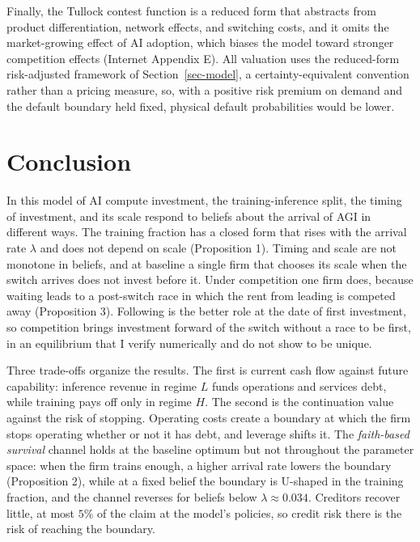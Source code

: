 \documentclass[
  11pt,
  letterpaper,
]{scrartcl}
\begin{document}
Finally, the Tullock contest function is a reduced form that abstracts
from product differentiation, network effects, and switching costs, and
it omits the market-growing effect of AI adoption, which biases the
model toward stronger competition effects (Internet Appendix E). All
valuation uses the reduced-form risk-adjusted framework of
Section~\ref{sec-model}, a certainty-equivalent convention rather than a
pricing measure, so, with a positive risk premium on demand and the
default boundary held fixed, physical default probabilities would be
lower.

\section{Conclusion}\label{sec-conclusion}

In this model of AI compute investment, the training-inference split,
the timing of investment, and its scale respond to beliefs about the
arrival of AGI in different ways. The training fraction has a closed
form that rises with the arrival rate \(\lambda\) and does not depend on
scale (Proposition 1). Timing and scale are not monotone in beliefs, and
at baseline a single firm that chooses its scale when the switch arrives
does not invest before it. Under competition one firm does, because
waiting leads to a post-switch race in which the rent from leading is
competed away (Proposition 3). Following is the better role at the date
of first investment, so competition brings investment forward of the
switch without a race to be first, in an equilibrium that I verify
numerically and do not show to be unique.

Three trade-offs organize the results. The first is current cash flow
against future capability: inference revenue in regime \(L\) funds
operations and services debt, while training pays off only in regime
\(H\). The second is the continuation value against the risk of
stopping. Operating costs create a boundary at which the firm stops
operating whether or not it has debt, and leverage shifts it. The
\emph{faith-based survival} channel holds at the baseline optimum but
not throughout the parameter space: when the firm trains enough, a
higher arrival rate lowers the boundary (Proposition 2), while at a
fixed belief the boundary is U-shaped in the training fraction, and the
channel reverses for beliefs below \(\lambda \approx 0.034\). Creditors
recover little, at most \(5\%\) of the claim at the model's policies, so
credit risk there is the risk of reaching the boundary.
\end{document}
